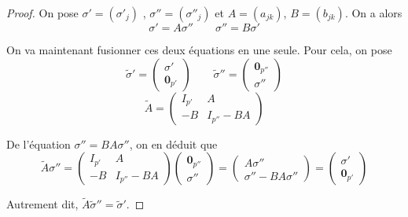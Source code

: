 \documentclass{article}
\theoremstyle{definition}
\theoremstyle{remarque}
\begin{document}
\begin{proof}
On pose $\sigma' = (\sigma'_j)$ , $\sigma'' = (\sigma''_j)$ et $A=(a_{jk})$, $B=(b_{jk})$. On a alors
\begin{equation*}
\sigma' = A\sigma'' \qquad
\sigma'' = B\sigma'
\end{equation*}

On va maintenant fusionner ces deux équations en une seule. Pour cela, on pose
\begin{equation*}
\tilde{\sigma}' = \begin{pmatrix}
   \sigma' \\
   \mathbf{0}_{p'}
\end{pmatrix} \qquad
\tilde{\sigma}'' = \begin{pmatrix}
   \mathbf{0}_{p''} \\
   \sigma''
\end{pmatrix}
\end{equation*}
$$ \tilde{A} = \begin{pmatrix}
   I_{p'} & A \\
   -B & I_{p''} - BA 
\end{pmatrix}$$

De l'équation $\sigma'' = BA\sigma''$, on en déduit que
\begin{equation*}
\tilde{A}\sigma'' = \begin{pmatrix}
   I_{p'} & A \\
   -B & I_{p''} - BA 
\end{pmatrix} \begin{pmatrix}
   \mathbf{0}_{p''} \\
   \sigma''
\end{pmatrix} = \begin{pmatrix}
   A\sigma'' \\
   \sigma'' - BA\sigma''
\end{pmatrix} = \begin{pmatrix}
   \sigma' \\
   \mathbf{0}_{p'}
\end{pmatrix}
\end{equation*}

Autrement dit, $\tilde{A}\tilde{\sigma}'' = \tilde{\sigma}'$.


\end{proof}
\end{document}
